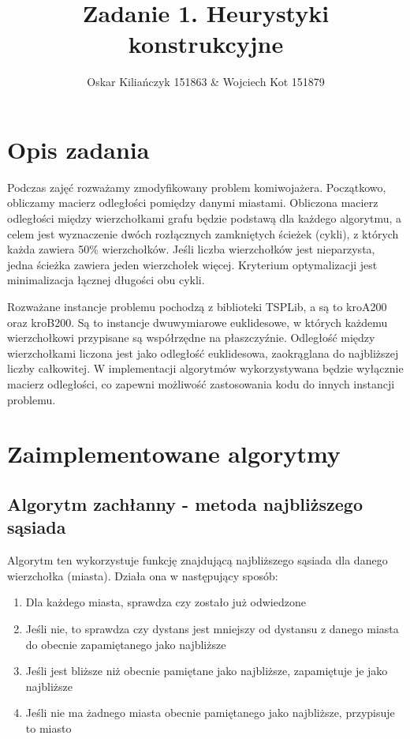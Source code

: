 \documentclass[11pt]{article}
\title{Zadanie 1. Heurystyki konstrukcyjne}
\author{Oskar Kiliańczyk 151863 \& Wojciech Kot 151879}
\date{}
\begin{document}
\maketitle
\newpage

\section{Opis zadania}\label{sec:opis-zadania}

Podczas zajęć rozważamy zmodyfikowany problem komiwojażera.
Początkowo, obliczamy macierz odległości pomiędzy danymi miastami.
Obliczona macierz odległości między wierzchołkami grafu będzie podstawą dla każdego algorytmu,
a celem jest wyznaczenie dwóch rozłącznych zamkniętych ścieżek (cykli), z których każda zawiera 50\% wierzchołków.
Jeśli liczba wierzchołków jest nieparzysta, jedna ścieżka zawiera jeden wierzchołek więcej.
Kryterium optymalizacji jest minimalizacja łącznej długości obu cykli.

Rozważane instancje problemu pochodzą z biblioteki TSPLib, a są to kroA200 oraz kroB200.
Są to instancje dwuwymiarowe euklidesowe, w których każdemu wierzchołkowi przypisane są współrzędne na płaszczyźnie.
Odległość między wierzchołkami liczona jest jako odległość euklidesowa, zaokrąglana do najbliższej liczby całkowitej.
W implementacji algorytmów wykorzystywana będzie wyłącznie macierz odległości, co zapewni możliwość zastosowania kodu do innych instancji problemu.

\section{Zaimplementowane algorytmy}\label{sec:zaimplementowane-algorytmy}

\subsection{Algorytm zachłanny - metoda najbliższego sąsiada}\label{subsec:algorytm-zachanny---metoda-najblizszego-sasiada}

Algorytm ten wykorzystuje funkcję znajdującą najbliższego sąsiada dla danego wierzchołka (miasta).
Działa ona w następujący sposób:
\begin{enumerate}
\item Dla każdego miasta, sprawdza czy zostało już odwiedzone
\item Jeśli nie, to sprawdza czy dystans jest mniejszy od dystansu z danego miasta do obecnie zapamiętanego jako najbliższe
\item Jeśli jest bliższe niż obecnie pamiętane jako najbliższe, zapamiętuje je jako najbliższe
\item Jeśli nie ma żadnego miasta obecnie pamiętanego jako najbliższe, przypisuje to miasto
\end{enumerate}
\end{document}
